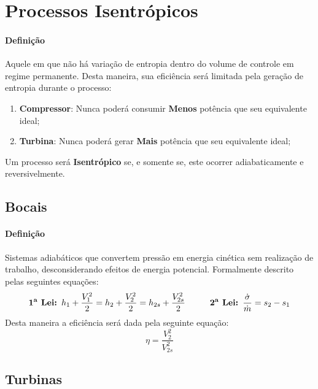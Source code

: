 \documentclass{article}
\begin{document}
    \section{Processos Isentrópicos}
        \paragraph{Definição}Aquele em que não há variação de entropia dentro do volume de controle em regime permanente. Desta maneira, sua eficiência será limitada pela geração de entropia durante o processo:
            \begin{enumerate}[noitemsep]
                \item \textbf{Compressor}: Nunca poderá consumir \textbf{Menos} potência que seu equivalente ideal;
                \item \textbf{Turbina}: Nunca poderá gerar \textbf{Mais} potência que seu equivalente ideal;
            \end{enumerate}
        Um processo será \textbf{Isentrópico} se, e somente se, este ocorrer adiabaticamente e reversivelmente.

        \subsection{Bocais}
            \paragraph{Definição}Sistemas adiabáticos que convertem pressão em energia cinética sem realização de trabalho, desconsiderando efeitos de energia potencial. Formalmente descrito pelas seguintes equações:
                \[
                    \textbf{1\textsuperscript{a} Lei: } h_{1} + \frac{V_{1}^{2}}{2} = h_{2} + \frac{V_{2}^{2}}{2} = h_{2s} + \frac{V_{2s}^{2}}{2} \hspace{10mm} 
                    \textbf{2\textsuperscript{a} Lei: } \frac{\dot{\sigma}}{\dot{m}} = s_{2} - s_{1}
                \]
            Desta maneira a eficiência será dada pela seguinte equação:
                \[\boxed{\eta = \frac{V_{2}^{2}}{V_{2s}^{2}}}\]

        \subsection{Turbinas}
\end{document}
